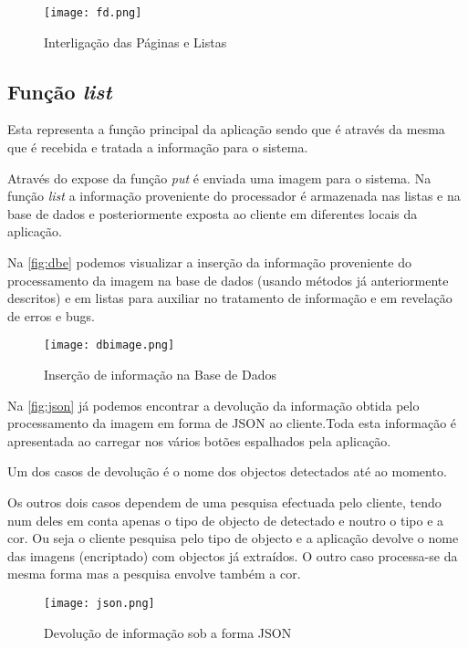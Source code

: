 \documentclass{report}
\begin{document}
\begin{figure}[h]
\center %
\texttt{[image: fd.png]}
\caption{Interligação das Páginas e Listas}
\label{fig:Listas}
\end{figure}


\subsection{Função {\itshape list}}
Esta representa a função principal da aplicação sendo que é através da mesma que é recebida e tratada a informação para o sistema.

Através do expose da função {\itshape{put}} é enviada uma imagem para o sistema. Na função {\itshape list} a informação proveniente do processador é armazenada nas listas e na base de dados e posteriormente exposta ao cliente em diferentes locais da aplicação.

Na \autoref{fig:dbe} podemos visualizar a inserção da informação proveniente do processamento da imagem na base de dados (usando métodos já anteriormente descritos) e em listas para auxiliar no tratamento de informação e em revelação de erros e bugs.


\begin{figure}[h]
\center %
\texttt{[image: dbimage.png]}
\caption{Inserção de informação na Base de Dados}
\label{fig:dbe}
\end{figure}


Na \autoref{fig:json} já podemos encontrar a devolução da informação obtida pelo processamento da imagem em forma de JSON ao cliente.Toda esta informação é apresentada ao carregar nos vários botões espalhados pela aplicação. 

Um dos casos de devolução é o nome dos objectos detectados até ao momento.

Os outros dois casos dependem de uma pesquisa efectuada pelo cliente, tendo num deles em conta apenas o tipo de objecto de detectado e noutro o tipo e a cor. Ou seja o cliente pesquisa pelo tipo de objecto e a aplicação devolve o nome das imagens (encriptado) com objectos já extraídos. O outro caso processa-se da mesma forma mas a pesquisa envolve também a cor.


\begin{figure}[h]
\center %
\texttt{[image: json.png]}
\caption{Devolução de informação sob a forma JSON}
\label{fig:json}
\end{figure}
\end{document}
